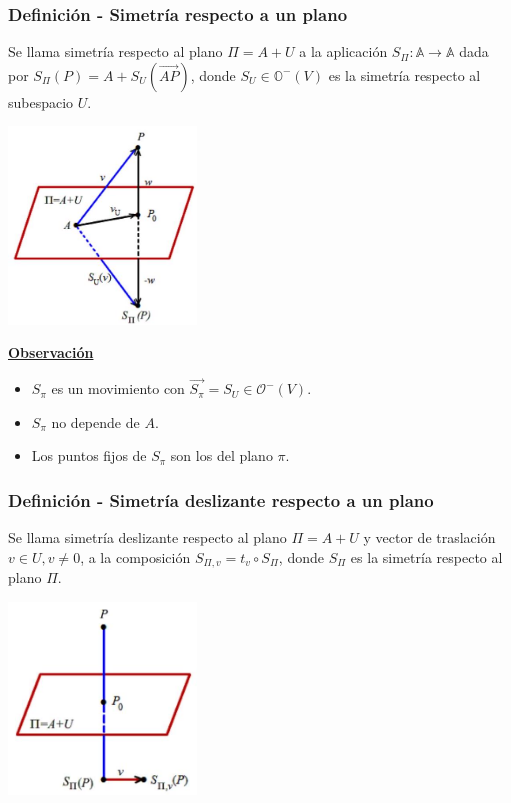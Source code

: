 \documentclass[12pt, a4paper, ones, notitlepage, openany,titlepage]{article}
\newcommand{\observacion}{\noindent\underline{\textbf{Observación}}}
\begin{document}
\subsubsection{Definición - Simetría respecto a un plano}
Se llama simetría respecto al plano $\Pi=A+U$ a la aplicación $S_{\Pi}: \mathbb{A} \rightarrow \mathbb{A}$ dada por $S_{\Pi}(P)=A+S_{U}(\overrightarrow{A P})$, donde $S_{U} \in \mathbb{O}^{-}(V)$ es la simetría respecto al subespacio $U$.

\begin{center}
	\includegraphics[max width=5cm]{2023_05_02_d6703e6c81ebe4fb6eaag-085}
\end{center}

\observacion

\begin{itemize}
	\item $S_\pi$ es un movimiento con $\overrightarrow{S_\pi} = S_U \in \mathcal{O}^-(V)$.
	\item $S_\pi$ no depende de $A$.
	\item Los puntos fijos de $S_\pi$ son los del plano $\pi$.
\end{itemize}

\subsubsection{Definición - Simetría deslizante respecto a un plano} Se llama simetría deslizante respecto al plano $\Pi=A+U$ y vector de traslación $v \in U, v \neq 0$, a la composición $S_{\Pi, v}=t_{v} \circ S_{\Pi}$, donde $S_{\Pi}$ es la simetría respecto al plano $\Pi$.

\begin{center}
	\includegraphics[max width=5cm]{2023_05_02_d6703e6c81ebe4fb6eaag-085(1)}
\end{center}
\end{document}

